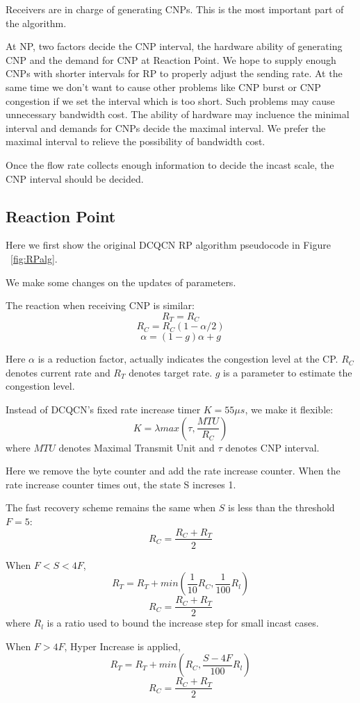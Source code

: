 \documentclass[12pt,a4paper]{article}
\begin{document}
Receivers are in charge of generating CNPs.
This is the most important part of the algorithm.

At NP, two factors decide the CNP interval, the hardware ability of generating CNP and the demand for CNP at Reaction Point.
We hope to supply enough CNPs with shorter intervals for RP to properly adjust the sending rate.
At the same time we don't want to cause other problems like CNP burst or CNP congestion if we set the interval which is too short.
Such problems may cause unnecessary bandwidth cost.
The ability of hardware may incluence the minimal interval and demands for CNPs decide the maximal interval.
We prefer the maximal interval to relieve the possibility of bandwidth cost.

Once the flow rate collects enough information to decide the incast scale, the CNP interval should be decided.

\subsection{Reaction Point}

Here we first show the original DCQCN RP algorithm pseudocode in Figure ~\ref{fig:RPalg}.

We make some changes on the updates of parameters.

The reaction when receiving CNP is similar:
\[R_T=R_C\]
\[R_C=R_C(1-\alpha /2)\]
\[\alpha = (1-g)\alpha + g\]

Here $\alpha$ is a reduction factor, actually indicates the congestion level at the CP.
$R_C$ denotes current rate and $R_T$ denotes target rate.
$g$ is a parameter to estimate the congestion level.

Instead of DCQCN's fixed rate increase timer $K=55\mu s$, we make it flexible:
\[K=\lambda max(\tau, \frac{MTU}{R_C})\]
where $MTU$ denotes Maximal Transmit Unit and $\tau$ denotes CNP interval.

Here we remove the byte counter and add the rate increase counter.
When the rate increase counter times out, the state S increses 1.

The fast recovery scheme remains the same when $S$ is less than the threshold $F = 5$:
\[R_C=\frac{R_C+R_T}{2}\]

When $F<S<4F$,
\[R_T=R_T+ min(\frac{1}{10}R_C,\frac{1}{100}R_l)\]
\[R_C=\frac{R_C+R_T}{2}\]
where $R_l$ is a ratio used to bound the increase step for small incast cases.

When $F>4F$, Hyper Increase is applied,
\[R_T=R_T+min(R_C, \frac{S-4F}{100}R_l)\]
\[R_C=\frac{R_C+R_T}{2}\]
\end{document}
